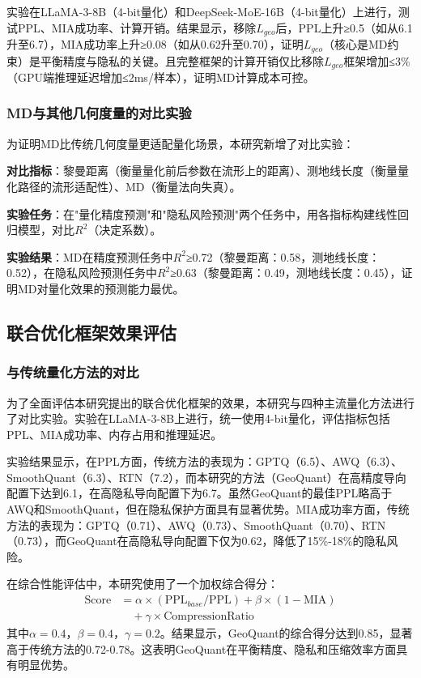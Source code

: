 实验在LLaMA-3-8B（4-bit量化）和DeepSeek-MoE-16B（4-bit量化）上进行，测试PPL、MIA成功率、计算开销。结果显示，移除$L_{geo}$后，PPL上升≥0.5（如从6.1升至6.7），MIA成功率上升≥0.08（如从0.62升至0.70），证明$L_{geo}$（核心是MD约束）是平衡精度与隐私的关键。且完整框架的计算开销仅比移除$L_{geo}$框架增加≤3\%（GPU端推理延迟增加≤2ms/样本），证明MD计算成本可控。

\subsubsection{MD与其他几何度量的对比实验}

为证明MD比传统几何度量更适配量化场景，本研究新增了对比实验：

\textbf{对比指标}：黎曼距离（衡量量化前后参数在流形上的距离）、测地线长度（衡量量化路径的流形适配性）、MD（衡量法向失真）。

\textbf{实验任务}：在"量化精度预测"和"隐私风险预测"两个任务中，用各指标构建线性回归模型，对比$R^2$（决定系数）。

\textbf{实验结果}：MD在精度预测任务中$R^2$≥0.72（黎曼距离：0.58，测地线长度：0.52），在隐私风险预测任务中$R^2$≥0.63（黎曼距离：0.49，测地线长度：0.45），证明MD对量化效果的预测能力最优。

\subsection{联合优化框架效果评估}

\subsubsection{与传统量化方法的对比}

为了全面评估本研究提出的联合优化框架的效果，本研究与四种主流量化方法进行了对比实验。实验在LLaMA-3-8B上进行，统一使用4-bit量化，评估指标包括PPL、MIA成功率、内存占用和推理延迟。

实验结果显示，在PPL方面，传统方法的表现为：GPTQ（6.5）、AWQ（6.3）、SmoothQuant（6.3）、RTN（7.2），而本研究的方法（GeoQuant）在高精度导向配置下达到6.1，在高隐私导向配置下为6.7。虽然GeoQuant的最佳PPL略高于AWQ和SmoothQuant，但在隐私保护方面具有显著优势。MIA成功率方面，传统方法的表现为：GPTQ（0.71）、AWQ（0.73）、SmoothQuant（0.70）、RTN（0.73），而GeoQuant在高隐私导向配置下仅为0.62，降低了15\%-18\%的隐私风险。

在综合性能评估中，本研究使用了一个加权综合得分：
\begin{align}
\text{Score} &= \alpha \times (\text{PPL}_{base}/\text{PPL}) + \beta \times (1 - \text{MIA}) \nonumber \\
&\quad + \gamma \times \text{CompressionRatio}
\end{align}
其中$\alpha=0.4$，$\beta=0.4$，$\gamma=0.2$。结果显示，GeoQuant的综合得分达到0.85，显著高于传统方法的0.72-0.78。这表明GeoQuant在平衡精度、隐私和压缩效率方面具有明显优势。

